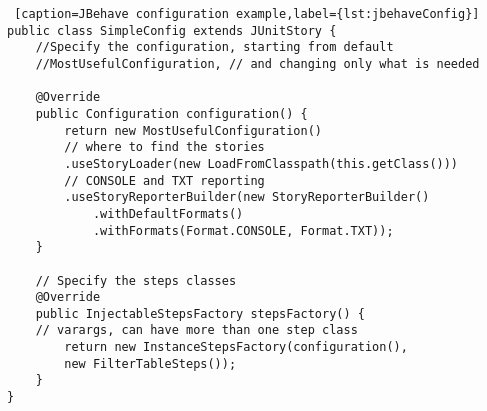 \lstset{style=a1listing}
\begin{lstlisting} [caption=JBehave configuration example,label={lst:jbehaveConfig}]
public class SimpleConfig extends JUnitStory {
	//Specify the configuration, starting from default
	//MostUsefulConfiguration, // and changing only what is needed
    
	@Override
	public Configuration configuration() {
		return new MostUsefulConfiguration()
		// where to find the stories
		.useStoryLoader(new LoadFromClasspath(this.getClass())) 
		// CONSOLE and TXT reporting
		.useStoryReporterBuilder(new StoryReporterBuilder()
			.withDefaultFormats()
			.withFormats(Format.CONSOLE, Format.TXT));
	}
 
	// Specify the steps classes
	@Override
	public InjectableStepsFactory stepsFactory() {    	
	// varargs, can have more than one step class
		return new InstanceStepsFactory(configuration(),
		new FilterTableSteps());
	}
}
\end{lstlisting}
